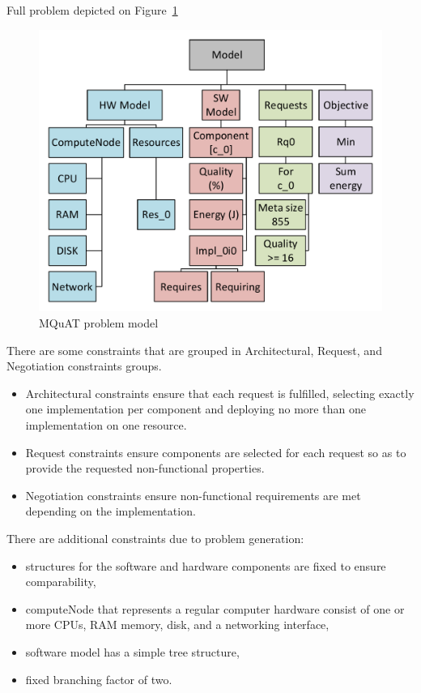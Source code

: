 Full problem depicted on Figure~\ref{fig:mquatmodel}

\begin{figure}
	\centering
	\includegraphics[width=\textwidth]{images/MQuATModel}
	\caption[MQuAT problem model]{MQuAT problem model}
	\label{fig:mquatmodel}
\end{figure}

There are some constraints that are grouped in Architectural, Request, and Negotiation constraints groups.

\begin{itemize}
	\item Architectural constraints ensure that each request is fulfilled, selecting exactly one implementation per component and deploying no more than one implementation on one resource.
	\item Request constraints ensure components are selected for each request so as to provide the requested non-functional properties.
	\item Negotiation constraints ensure non-functional requirements are met depending on the implementation.
\end{itemize}

There are additional constraints due to problem generation:

\begin{itemize}
	\item structures for the software and hardware components are fixed to ensure comparability,
	\item computeNode that represents a regular computer hardware consist of one or more CPUs, RAM memory, disk, and a networking interface,
	\item software model has a simple tree structure,
	\item fixed branching factor of two.
\end{itemize}

